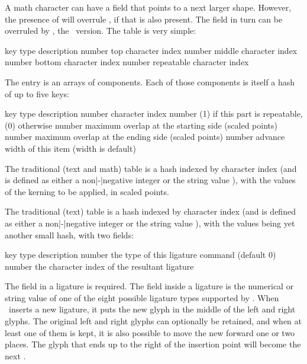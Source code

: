 A math character can have a  field that points to a next larger
shape. However, the presence of  will overrule , if
that is also present. The  field in turn can be overruled by
, the \OPENTYPE\ version. The  table is very
simple:

\starttabulate[|l|l|p|]
\FL
\BC key        \BC type   \BC description                \NC \NR
\ML
\NC {} \NC number \NC top character index        \NC \NR
\NC {} \NC number \NC middle character index     \NC \NR
\NC {} \NC number \NC bottom character index     \NC \NR
\NC {} \NC number \NC repeatable character index \NC \NR
\LL
\stoptabulate

The  entry is an arrays of components. Each of those components is
itself a hash of up to five keys:

\starttabulate[|l|l|p|]
\FL
\BC key             \BC type   \BC description                                          \NC \NR
\ML
\NC {}    \NC number \NC character index                                      \NC \NR
\NC {} \NC number \NC (1) if this part is repeatable, (0) otherwise        \NC \NR
\NC {}    \NC number \NC maximum overlap at the starting side (scaled points) \NC \NR
\NC {}      \NC number \NC maximum overlap at the ending side (scaled points)   \NC \NR
\NC {}  \NC number \NC advance width of this item (width is default)        \NC \NR
\LL
\stoptabulate

The traditional (text and math)  table is a hash indexed by
character index (and  is defined as either a
non|-|negative integer or the string value ), with the
values of the kerning to be applied, in scaled points.

The traditional (text)  table is a hash indexed by character
index (and  is defined as either a non|-|negative integer
or the string value ), with the values being yet another
small hash, with two fields:

\starttabulate[|l|l|p|]
\FL
\BC key         \BC type   \BC description                                   \NC \NR
\ML
\NC {} \NC number \NC the type of this ligature command (default 0) \NC \NR
\NC {} \NC number \NC the character index of the resultant ligature \NC \NR
\LL
\stoptabulate

The  field in a ligature is required. The  field inside a
ligature is the numerical or string value of one of the eight possible ligature
types supported by \TEX. When \TEX\ inserts a new ligature, it puts the new glyph
in the middle of the left and right glyphs. The original left and right glyphs
can optionally be retained, and when at least one of them is kept, it is also
possible to move the new  forward one or two places. The
glyph that ends up to the right of the insertion point will become the next
.

